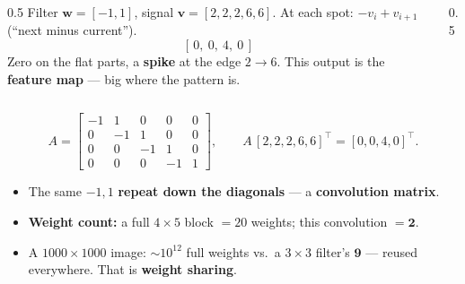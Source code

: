 \documentclass[aspectratio=169, 11pt]{beamer}
\newcommand{\vv}{\mathbf{v}}
\newcommand{\ww}{\mathbf{w}}
\begin{document}
\begin{frame}[t, plain]
  \begin{columns}[T]
    \begin{column}{0.5\textwidth}
      Filter $\ww=[-1,1]$, signal $\vv=[2,2,2,6,6]$. At each spot: $-v_i+v_{i+1}$ (``next minus current'').
      \[ [\,0,\ 0,\ 4,\ 0\,] \]
      Zero on the flat parts, a \textbf{spike} at the edge $2\to6$. This output is the \textbf{feature map} ---
      big where the pattern is.
    \end{column}
    \begin{column}{0.5\textwidth}
      \centering
    \end{column}
  \end{columns}
\end{frame}

\begin{frame}[t, plain]
  \[ A=\begin{bmatrix} -1 & 1 & 0 & 0 & 0\\ 0 & -1 & 1 & 0 & 0\\ 0 & 0 & -1 & 1 & 0\\ 0 & 0 & 0 & -1 & 1 \end{bmatrix},
     \qquad A\,[2,2,2,6,6]^{\!\top}=[0,0,4,0]^{\!\top}. \]
  \begin{itemize}
    \setlength{\itemsep}{5pt}
    \item The same $-1,1$ \textbf{repeat down the diagonals} --- a \textbf{convolution matrix}.
    \item \textbf{Weight count:} a full $4\times5$ block $=20$ weights; this convolution $=\mathbf{2}$.
    \item A $1000\times1000$ image: $\sim\!10^{12}$ full weights vs.\ a $3\times3$ filter's $\mathbf{9}$ ---
          reused everywhere. That is \textbf{weight sharing}.
  \end{itemize}
\end{frame}
\end{document}

